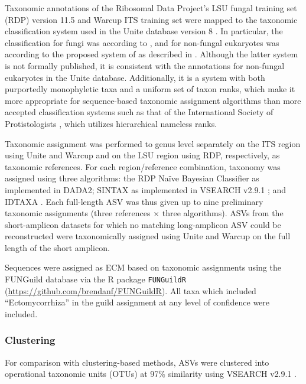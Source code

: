\documentclass[
  12pt,
]{article}
\begin{document}
Taxonomic annotations of the Ribosomal Data Project's LSU fungal training set (RDP) version 11.5 \autocite{cole2014} and Warcup ITS training set \autocite{deshpande2016} were mapped to the taxonomic classification system used in the Unite database version 8 \autocite{nilsson2019a}.
In particular, the classification for fungi was according to \textcite{tedersoo2018}, and for non-fungal eukaryotes was according to the proposed system of \textcite{tedersoo2017c} as described in \autocite{tedersoodata2017}.
Although the latter system is not formally published, it is consistent with the annotations for non-fungal eukaryotes in the Unite database.
Additionally, it is a system with both purportedly monophyletic taxa and a uniform set of taxon ranks, which make it more appropriate for sequence-based taxonomic assignment algorithms than more accepted classification systems such as that of the International Society of Protistologists \autocite{adl2019}, which utilizes hierarchical nameless ranks.

Taxonomic assignment was performed to genus level separately on the ITS region using Unite and Warcup and on the LSU region using RDP, respectively, as taxonomic references.
For each region/reference combination, taxonomy was assigned using three algorithms:
the RDP Naïve Bayesian Classifier \autocite[RDPC,][]{wang2007} as implemented in DADA2;
SINTAX \autocite{edgar2016a} as implemented in VSEARCH v2.9.1 \autocite{rognes2016};
and IDTAXA \autocite{murali2018}.
Each full-length ASV was thus given up to nine preliminary taxonomic assignments (three references \(\times\) three algorithms).
ASVs from the short-amplicon datasets for which no matching long-amplicon ASV could be reconstructed were taxonomically assigned using Unite and Warcup on the full length of the short amplicon.

Sequences were assigned as ECM based on taxonomic assignments using the FUNGuild database \autocite{nguyen2016funguild} via the R package \texttt{FUNGuildR} (\url{https://github.com/brendanf/FUNGuildR}).
All taxa which included ``Ectomycorrhiza'' in the guild assignment at any level of confidence were included.

\hypertarget{clustering}{%
\subsubsection{Clustering}\label{clustering}}

For comparison with clustering-based methods, ASVs were clustered into operational taxonomic units (OTUs) at 97\% similarity using VSEARCH v2.9.1 \autocite{rognes2016}.
\end{document}
